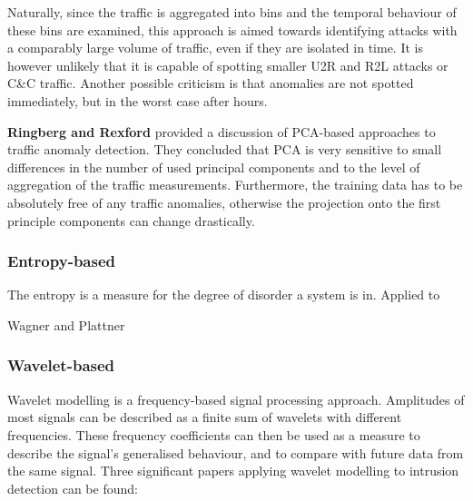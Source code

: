\documentclass[a4paper,12pt,twoside]{report}
\begin{document}
Naturally, since the traffic is aggregated into bins and the temporal behaviour of these bins are examined, this approach is aimed towards identifying attacks with a comparably large volume of traffic, even if they are isolated in time. It is however unlikely that it is capable of spotting smaller U2R and R2L attacks or C\&C traffic. Another possible criticism is that anomalies are not spotted immediately, but in the worst case after hours.


\textbf{Ringberg and Rexford} \cite{ringberg_sensitivity_2007} provided a discussion of PCA-based approaches to traffic anomaly detection. They concluded that PCA is very sensitive to small differences in the number of used principal components and to the level of aggregation of the traffic measurements. Furthermore, the training data has to be absolutely free of any traffic anomalies, otherwise the projection onto the first principle components can change drastically. 

\subsubsection{Entropy-based}

The entropy is a measure for the degree of disorder a system is in. Applied to 

Wagner and Plattner \cite{wagner2005entropy} 



\subsubsection{Wavelet-based}

Wavelet modelling is a frequency-based signal processing approach. Amplitudes of most signals can be described as a finite sum of wavelets with different frequencies. These frequency coefficients can then be used as a measure to describe the signal's generalised behaviour, and to compare with future data from the same signal. Three significant papers applying wavelet modelling to intrusion detection can be found:

\end{document}
